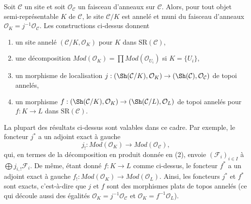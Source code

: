 \begin{remark}
\label{remark-semi-representable-ringed}
Soit $\mathcal{C}$ un site et soit $\mathcal{O}_\mathcal{C}$
un faisceau d'anneaux sur $\mathcal{C}$. Alors, pour tout
objet semi-représentable $K$ de $\mathcal{C}$, le site
$\mathcal{C}/K$ est annelé et muni du faisceau d'anneaux
$\mathcal{O}_K = j^{-1}\mathcal{O}_\mathcal{C}$.
Les constructions ci-dessus donnent
\begin{enumerate}
\item un site annelé $(\mathcal{C}/K, \mathcal{O}_K)$
pour $K$ dans $\text{SR}(\mathcal{C})$,
\item une décomposition
$\textit{Mod}(\mathcal{O}_K) =
\prod \textit{Mod}(\mathcal{O}_{U_i})$ si $K = \{U_i\}$,
\item un morphisme de localisation
$j : (\Sh(\mathcal{C}/K), \mathcal{O}_K) \to
(\Sh(\mathcal{C}), \mathcal{O}_\mathcal{C})$
de topoi annelés,
\item un morphisme
$f : (\Sh(\mathcal{C}/K), \mathcal{O}_K) \to
(\Sh(\mathcal{C}/L), \mathcal{O}_L)$ de topoi annelés
pour $f : K \to L$ dans $\text{SR}(\mathcal{C})$.
\end{enumerate}
La plupart des résultats ci-dessus sont valables dans ce cadre. Par exemple, le foncteur
$j^*$ a un adjoint exact à gauche
$$
j_! : \textit{Mod}(\mathcal{O}_K) \to \textit{Mod}(\mathcal{O}_\mathcal{C}),
$$
qui, en termes de la décomposition en produit donnée en (2), envoie
$(\mathcal{F}_i)_{i \in I}$ à $\bigoplus j_{i, !}\mathcal{F}_i$.
De même, étant donné $f : K \to L$ comme ci-dessus, le foncteur $f^*$ a
un adjoint exact à gauche
$f_! : \textit{Mod}(\mathcal{O}_K) \to \textit{Mod}(\mathcal{O}_L)$.
Ainsi, les foncteurs $j^*$ et $f^*$ sont exacts, c'est-à-dire que
$j$ et $f$ sont des morphismes plats de topos annelés (ce qui découle aussi
des égalités $\mathcal{O}_K = j^{-1}\mathcal{O}_\mathcal{C}$
et $\mathcal{O}_K = f^{-1}\mathcal{O}_L$).
\end{remark}

